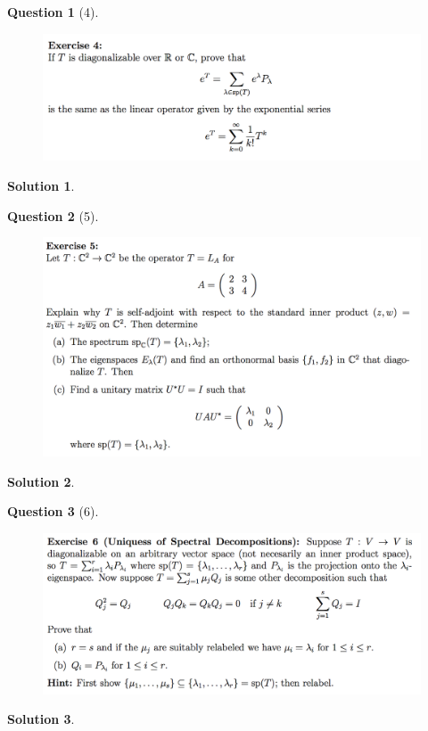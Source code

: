 \documentclass{article} %
\theoremstyle{quest}
\newtheorem*{question}{Question}
\newtheorem*{solution}{Solution}
\begin{document}
\begin{question}[4]
\hfill
\begin{figure}[h!]
  \centering
    \includegraphics[width=1\textwidth]{LA-1-4.png}
\end{figure}
\end{question}
\begin{solution}
\end{solution}

\pagebreak

\begin{question}[5]
\hfill
\begin{figure}[h!]
  \centering
    \includegraphics[width=1\textwidth]{LA-1-5.png}
\end{figure}
\end{question}
\begin{solution}
\end{solution}

\pagebreak

\begin{question}[6]
\hfill
\begin{figure}[h!]
  \centering
    \includegraphics[width=1\textwidth]{LA-1-6.png}
\end{figure}
\end{question}
\begin{solution}
\end{solution}
\end{document}

